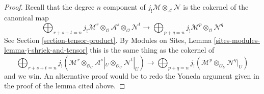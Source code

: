 \documentclass[10pt,a4paper]{amsart}
\theoremstyle{plain}
\theoremstyle{definition}
\theoremstyle{remark}
\numberwithin{equation}{subsection}
\begin{document}
\begin{proof}
Recall that the degree $n$ component of
$j_!\mathcal{M} \otimes_\mathcal{A} \mathcal{N}$ is the cokernel of
the canonical map
$$
\bigoplus\nolimits_{r + s + t = n}
j_!\mathcal{M}^r \otimes_\mathcal{O}
\mathcal{A}^s \otimes_\mathcal{O}
\mathcal{N}^t
\longrightarrow
\bigoplus\nolimits_{p + q = n}
j_!\mathcal{M}^p \otimes_\mathcal{O} \mathcal{N}^q
$$
See Section \ref{section-tensor-product}.
By Modules on Sites, Lemma \ref{sites-modules-lemma-j-shriek-and-tensor}
this is the same thing as the cokernel of
$$
\bigoplus\nolimits_{r + s + t = n}
j_!(\mathcal{M}^r \otimes_{\mathcal{O}_U}
\mathcal{A}^s|_U \otimes_{\mathcal{O}_U}
\mathcal{N}^t|_U)
\longrightarrow
\bigoplus\nolimits_{p + q = n}
j_!(\mathcal{M}^p \otimes_{\mathcal{O}_U} \mathcal{N}^q|_U)
$$
and we win. An alternative proof would be to redo the Yoneda
argument given in the proof of the lemma cited above.
\end{proof}
\end{document}
